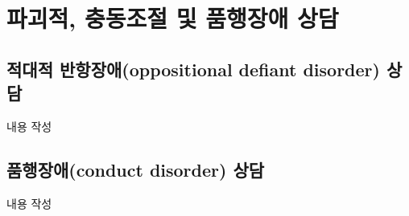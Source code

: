 \section{파괴적, 충동조절 및 품행장애 상담}

\subsection{적대적 반항장애(oppositional defiant disorder) 상담}
내용 작성

\subsection{품행장애(conduct disorder) 상담}
내용 작성
